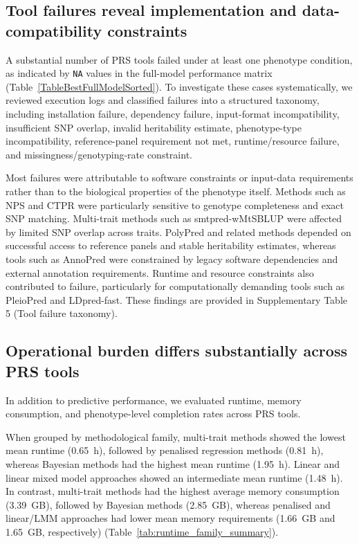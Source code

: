 \documentclass[pdflatex,sn-basic]{sn-jnl}
\begin{document}
\subsection*{Tool failures reveal implementation and data-compatibility constraints}

A substantial number of PRS tools failed under at least one phenotype condition, as indicated by \texttt{NA} values in the full-model performance matrix (Table~\ref{TableBestFullModelSorted}). To investigate these cases systematically, we reviewed execution logs and classified failures into a structured taxonomy, including installation failure, dependency failure, input-format incompatibility, insufficient SNP overlap, invalid heritability estimate, phenotype-type incompatibility, reference-panel requirement not met, runtime/resource failure, and missingness/genotyping-rate constraint.

Most failures were attributable to software constraints or input-data requirements rather than to the biological properties of the phenotype itself. Methods such as NPS and CTPR were particularly sensitive to genotype completeness and exact SNP matching. Multi-trait methods such as smtpred-wMtSBLUP were affected by limited SNP overlap across traits. PolyPred and related methods depended on successful access to reference panels and stable heritability estimates, whereas tools such as AnnoPred were constrained by legacy software dependencies and external annotation requirements. Runtime and resource constraints also contributed to failure, particularly for computationally demanding tools such as PleioPred and LDpred-fast. These findings are provided in Supplementary Table 5 (Tool failure taxonomy).




\subsection*{Operational burden differs substantially across PRS tools}

In addition to predictive performance, we evaluated runtime, memory consumption, and phenotype-level completion rates across PRS tools.

When grouped by methodological family, multi-trait methods showed the lowest mean runtime (0.65~h), followed by penalised regression methods (0.81~h), whereas Bayesian methods had the highest mean runtime (1.95~h). Linear and linear mixed model approaches showed an intermediate mean runtime (1.48~h). In contrast, multi-trait methods had the highest average memory consumption (3.39~GB), followed by Bayesian methods (2.85~GB), whereas penalised and linear/LMM approaches had lower mean memory requirements (1.66~GB and 1.65~GB, respectively) (Table~\ref{tab:runtime_family_summary}).
\end{document}
